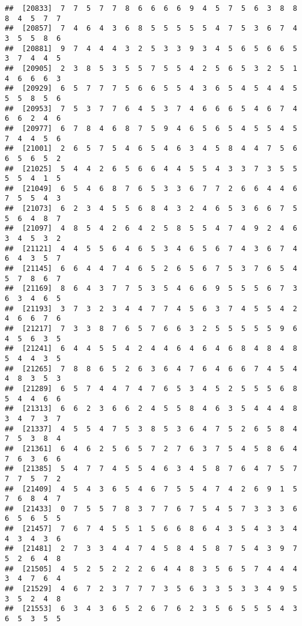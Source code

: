 \documentclass[
]{book}
\begin{document}
\begin{verbatim}
##  [20833]  7  7  5  7  7  8  6  6  6  6  9  4  5  7  5  6  3  8  8  8  4  5  7  7
##  [20857]  7  4  6  4  3  6  8  5  5  5  5  5  4  7  5  3  6  7  4  3  5  5  8  6
##  [20881]  9  7  4  4  4  3  2  5  3  3  9  3  4  5  6  5  6  6  5  3  7  4  4  5
##  [20905]  2  3  8  5  3  5  5  7  5  5  4  2  5  6  5  3  2  5  1  4  6  6  6  3
##  [20929]  6  5  7  7  7  5  6  6  5  5  4  3  6  5  4  5  4  4  5  5  5  8  5  6
##  [20953]  7  5  3  7  7  6  4  5  3  7  4  6  6  6  5  4  6  7  4  6  6  2  4  6
##  [20977]  6  7  8  4  6  8  7  5  9  4  6  5  6  5  4  5  5  4  5  7  4  4  5  6
##  [21001]  2  6  5  7  5  4  6  5  4  6  3  4  5  8  4  4  7  5  6  6  5  6  5  2
##  [21025]  5  4  4  2  6  5  6  6  4  4  5  5  4  3  3  7  3  5  5  5  5  4  1  5
##  [21049]  6  5  4  6  8  7  6  5  3  3  6  7  7  2  6  6  4  4  6  7  5  5  4  3
##  [21073]  6  2  3  4  5  5  6  8  4  3  2  4  6  5  3  6  6  7  5  5  6  4  8  7
##  [21097]  4  8  5  4  2  6  4  2  5  8  5  5  4  7  4  9  2  4  6  3  4  5  3  2
##  [21121]  4  4  5  5  6  4  6  5  3  4  6  5  6  7  4  3  6  7  4  6  4  3  5  7
##  [21145]  6  6  4  4  7  4  6  5  2  6  5  6  7  5  3  7  6  5  4  5  7  8  6  7
##  [21169]  8  6  4  3  7  7  5  3  5  4  6  6  9  5  5  5  6  7  3  6  3  4  6  5
##  [21193]  3  7  3  2  3  4  4  7  7  4  5  6  3  7  4  5  5  4  2  4  6  6  7  6
##  [21217]  7  3  3  8  7  6  5  7  6  6  3  2  5  5  5  5  5  9  6  4  5  6  3  5
##  [21241]  6  4  4  5  5  4  2  4  4  6  4  6  4  6  8  4  8  4  8  5  4  4  3  5
##  [21265]  7  8  8  6  5  2  6  3  6  4  7  6  4  6  6  7  4  5  4  4  8  3  5  3
##  [21289]  6  5  7  4  4  7  4  7  6  5  3  4  5  2  5  5  5  6  8  5  4  4  6  6
##  [21313]  6  6  2  3  6  6  2  4  5  5  8  4  6  3  5  4  4  4  8  3  4  7  3  7
##  [21337]  4  5  5  4  7  5  3  8  5  3  6  4  7  5  2  6  5  8  4  7  5  3  8  4
##  [21361]  6  4  6  2  5  6  5  7  2  7  6  3  7  5  4  5  8  6  4  7  6  3  6  6
##  [21385]  5  4  7  7  4  5  5  4  6  3  4  5  8  7  6  4  7  5  7  7  7  5  7  2
##  [21409]  4  5  4  3  6  5  4  6  7  5  5  4  7  4  2  6  9  1  5  7  6  8  4  7
##  [21433]  0  7  5  5  7  8  3  7  7  6  7  5  4  5  7  3  3  3  6  6  5  6  5  5
##  [21457]  7  6  7  4  5  5  1  5  6  6  8  6  4  3  5  4  3  3  4  4  3  4  3  6
##  [21481]  2  7  3  3  4  4  7  4  5  8  4  5  8  7  5  4  3  9  7  5  2  6  4  8
##  [21505]  4  5  2  5  2  2  2  6  4  4  8  3  5  6  5  7  4  4  4  3  4  7  6  4
##  [21529]  4  6  7  2  3  7  7  7  3  5  6  3  3  5  3  3  4  9  5  3  5  2  4  8
##  [21553]  6  3  4  3  6  5  2  6  7  6  2  3  5  6  5  5  5  4  3  6  5  3  5  5

\end{verbatim}
\end{document}
